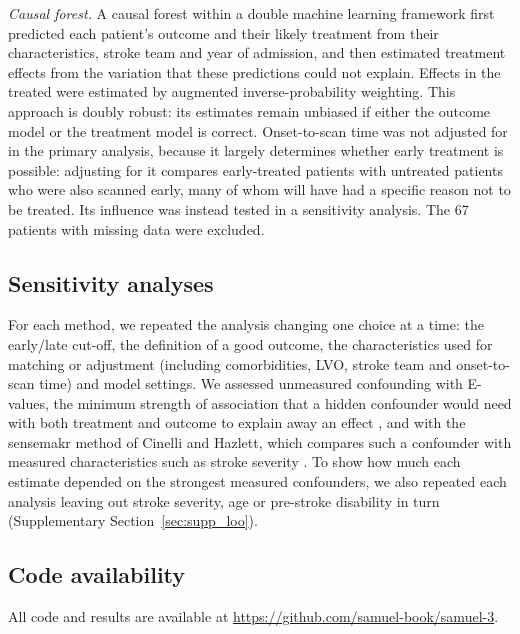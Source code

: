 \textit{Causal forest.} A causal forest within a double machine learning framework \cite{chernozhukov2018double,wager2018estimation} first predicted each patient's outcome and their likely treatment from their characteristics, stroke team and year of admission, and then estimated treatment effects from the variation that these predictions could not explain. Effects in the treated were estimated by augmented inverse-probability weighting. This approach is doubly robust: its estimates remain unbiased if either the outcome model or the treatment model is correct. Onset-to-scan time was not adjusted for in the primary analysis, because it largely determines whether early treatment is possible: adjusting for it compares early-treated patients with untreated patients who were also scanned early, many of whom will have had a specific reason not to be treated. Its influence was instead tested in a sensitivity analysis. The 67 patients with missing data were excluded.

\subsection{Sensitivity analyses}

For each method, we repeated the analysis changing one choice at a time: the early/late cut-off, the definition of a good outcome, the characteristics used for matching or adjustment (including comorbidities, LVO, stroke team and onset-to-scan time) and model settings. We assessed unmeasured confounding with E-values, the minimum strength of association that a hidden confounder would need with both treatment and outcome to explain away an effect \cite{vanderweele2017evalue}, and with the sensemakr method of Cinelli and Hazlett, which compares such a confounder with measured characteristics such as stroke severity \cite{cinelli2020sensemakr}. To show how much each estimate depended on the strongest measured confounders, we also repeated each analysis leaving out stroke severity, age or pre-stroke disability in turn (Supplementary Section~\ref{sec:supp_loo}).

\subsection{Code availability}

All code and results are available at \url{https://github.com/samuel-book/samuel-3}.